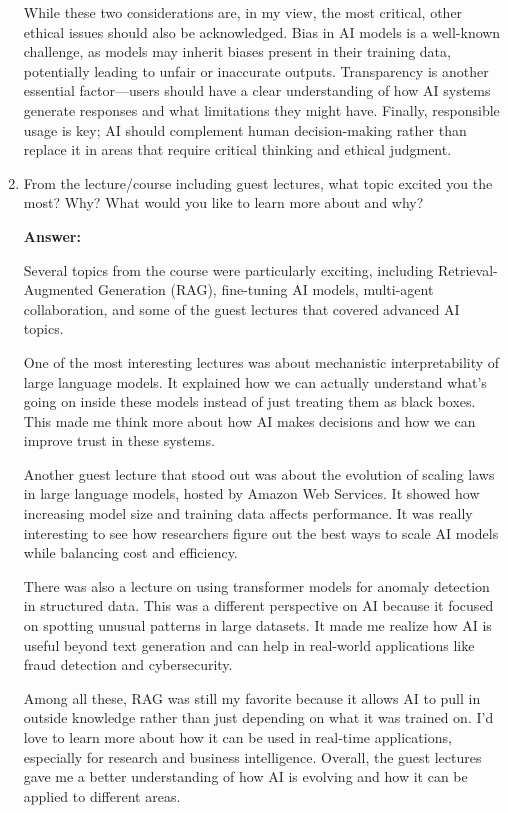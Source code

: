 \begin{enumerate}
While these two considerations are, in my view, the most critical, other ethical issues should also be acknowledged. Bias in AI models is a well-known challenge, as models may inherit biases present in their training data, potentially leading to unfair or inaccurate outputs. Transparency is another essential factor—users should have a clear understanding of how AI systems generate responses and what limitations they might have. Finally, responsible usage is key; AI should complement human decision-making rather than replace it in areas that require critical thinking and ethical judgment.


     \item From the lecture/course including guest lectures, what topic excited you the most? Why? What would you like to learn more about and why? 
    
     \textbf{Answer:}

     Several topics from the course were particularly exciting, including Retrieval-Augmented Generation (RAG), fine-tuning AI models, multi-agent collaboration, and some of the guest lectures that covered advanced AI topics.

One of the most interesting lectures was about mechanistic interpretability of large language models. It explained how we can actually understand what’s going on inside these models instead of just treating them as black boxes. This made me think more about how AI makes decisions and how we can improve trust in these systems.

Another guest lecture that stood out was about the evolution of scaling laws in large language models, hosted by Amazon Web Services. It showed how increasing model size and training data affects performance. It was really interesting to see how researchers figure out the best ways to scale AI models while balancing cost and efficiency.

There was also a lecture on using transformer models for anomaly detection in structured data. This was a different perspective on AI because it focused on spotting unusual patterns in large datasets. It made me realize how AI is useful beyond text generation and can help in real-world applications like fraud detection and cybersecurity.

Among all these, RAG was still my favorite because it allows AI to pull in outside knowledge rather than just depending on what it was trained on. I’d love to learn more about how it can be used in real-time applications, especially for research and business intelligence. Overall, the guest lectures gave me a better understanding of how AI is evolving and how it can be applied to different areas.




\end{enumerate}
